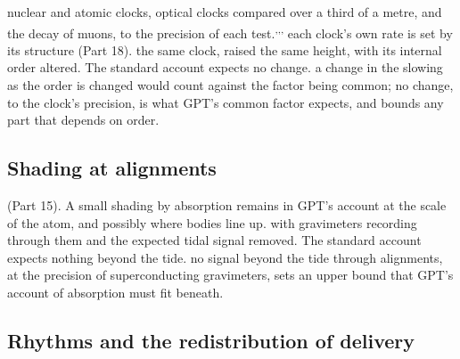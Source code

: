 \documentclass[11pt,a4paper]{article}
\begin{document}
 nuclear and atomic clocks, optical clocks compared over a third of a metre, and the decay of muons, to the precision of each test.\textsuperscript{,}\textsuperscript{,}\textsuperscript{,}  each clock's own rate is set by its structure (Part 18).  the same clock, raised the same height, with its internal order altered. The standard account expects no change.  a change in the slowing as the order is changed would count against the factor being common; no change, to the clock's precision, is what GPT's common factor expects, and bounds any part that depends on order.

\subsection{Shading at alignments}\label{sec:alignments}

 (Part 15). A small shading by absorption remains in GPT's account at the scale of the atom, and possibly where bodies line up.  with gravimeters recording through them and the expected tidal signal removed. The standard account expects nothing beyond the tide.  no signal beyond the tide through alignments, at the precision of superconducting gravimeters, sets an upper bound that GPT's account of absorption must fit beneath.

\subsection{Rhythms and the redistribution of delivery}\label{sec:rhythms}
\end{document}
